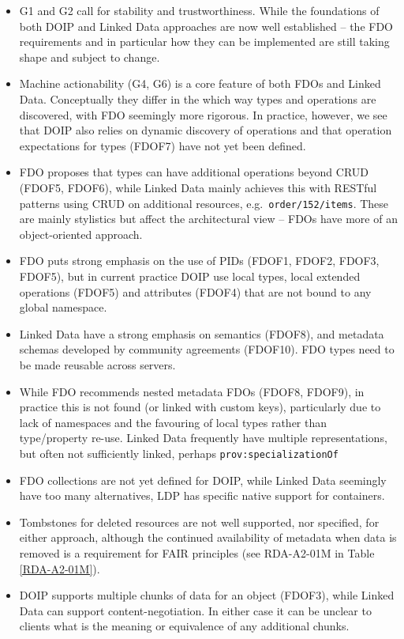 \documentclass[fleqn,10pt,NOlineno]{wlpeerjlua}
\providecommand{\tightlist}{%
  \setlength{\itemsep}{0pt}\setlength{\parskip}{0pt}}
\begin{document}
\begin{itemize}
\tightlist
\item
  G1 and G2 call for stability and trustworthiness. While the foundations of both DOIP and Linked Data approaches are now well established -- the FDO requirements and in particular how they can be implemented are still taking shape and subject to change.
\item
  Machine actionability (G4, G6) is a core feature of both FDOs and Linked Data. Conceptually they differ in the which way types and operations are discovered, with FDO seemingly more rigorous. In practice, however, we see that DOIP also relies on dynamic discovery of operations and that operation expectations for types (FDOF7) have not yet been defined.
\item
  FDO proposes that types can have additional operations beyond CRUD (FDOF5, FDOF6), while Linked Data mainly achieves this with RESTful patterns using CRUD on additional resources, e.g.~\texttt{order/152/items}. These are mainly stylistics but affect the architectural view -- FDOs have more of an object-oriented approach.
\item
  FDO puts strong emphasis on the use of PIDs (FDOF1, FDOF2, FDOF3, FDOF5), but in current practice DOIP use local types, local extended operations (FDOF5) and attributes (FDOF4) that are not bound to any global namespace.
\item
  Linked Data have a strong emphasis on semantics (FDOF8), and metadata schemas developed by community agreements (FDOF10). FDO types need to be made reusable across servers.
\item
  While FDO recommends nested metadata FDOs (FDOF8, FDOF9), in practice this is not found (or linked with custom keys), particularly due to lack of namespaces and the favouring of local types rather than type/property re-use. Linked Data frequently have multiple representations, but often not sufficiently linked, perhaps \texttt{prov:specializationOf} \autocite{w3-prov-o}
\item
  FDO collections are not yet defined for DOIP, while Linked Data seemingly have too many alternatives, LDP has specific native support for containers.
\item
  Tombstones for deleted resources are not well supported, nor specified, for either approach, although the continued availability of metadata when data is removed is a requirement for FAIR principles (see RDA-A2-01M in Table \vref{RDA-A2-01M}).
\item
  DOIP supports multiple chunks of data for an object (FDOF3), while Linked Data can support content-negotiation. In either case it can be unclear to clients what is the meaning or equivalence of any additional chunks.
\end{itemize}
\end{document}
